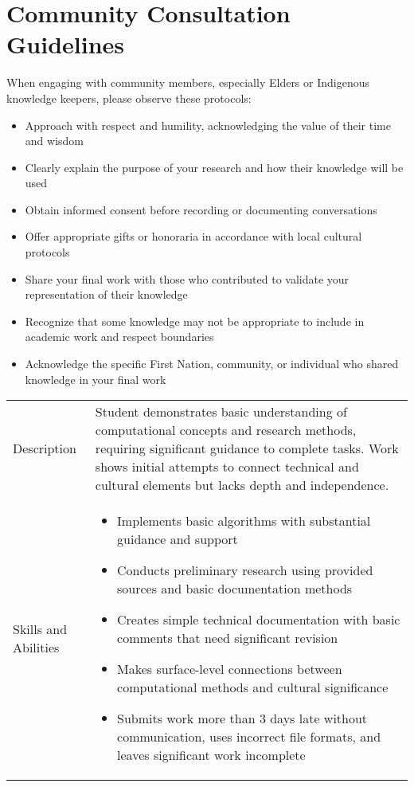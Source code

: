 \documentclass[12pt]{article}
\begin{document}
\newpage

\section*{Community Consultation Guidelines}
When engaging with community members, especially Elders or Indigenous knowledge keepers, please observe these protocols:
\begin{itemize}
    \item Approach with respect and humility, acknowledging the value of their time and wisdom
    \item Clearly explain the purpose of your research and how their knowledge will be used
    \item Obtain informed consent before recording or documenting conversations
    \item Offer appropriate gifts or honoraria in accordance with local cultural protocols
    \item Share your final work with those who contributed to validate your representation of their knowledge
    \item Recognize that some knowledge may not be appropriate to include in academic work and respect boundaries
    \item Acknowledge the specific First Nation, community, or individual who shared knowledge in your final work
\end{itemize}

\newpage
\begin{table}[t]
\renewcommand{\arraystretch}{1.5}
\begin{tabular}{>{\raggedright\arraybackslash}p{2cm}|>{\raggedright\arraybackslash}p{14cm}}
\toprule
\multicolumn{2}{l}{\textbf{Emerging}} \\
\midrule
Description & Student demonstrates basic understanding of computational concepts and research methods, requiring significant guidance to complete tasks. Work shows initial attempts to connect technical and cultural elements but lacks depth and independence. \\
\midrule
Skills and Abilities & 
\begin{itemize}
    \item Implements basic algorithms with substantial guidance and support
    \item Conducts preliminary research using provided sources and basic documentation methods
    \item Creates simple technical documentation with basic comments that need significant revision
    \item Makes surface-level connections between computational methods and cultural significance
    \item Submits work more than 3 days late without communication, uses incorrect file formats, and leaves significant work incomplete
\end{itemize} \\
\bottomrule
\end{tabular}
\end{table}
\end{document}
